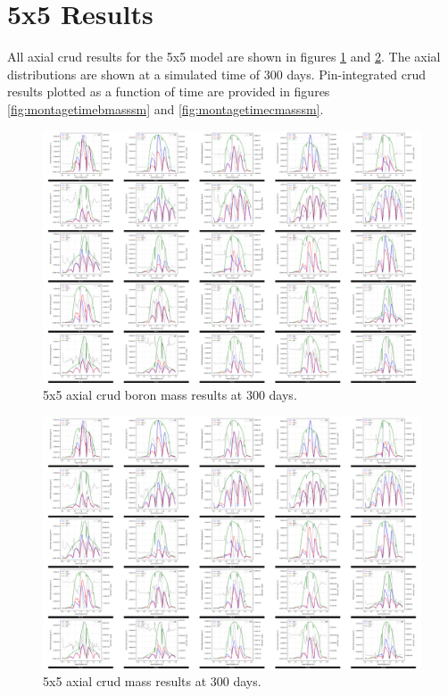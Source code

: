 
\section{5x5 Results}

All axial crud results for the 5x5 model are shown in figures \ref{fig:montageaxialbmasssm} and \ref{fig:montageaxialcmasssm}.  The axial distributions are shown at a simulated time of 300 days. Pin-integrated crud results plotted as a function of time are provided in figures \ref{fig:montagetimebmasssm} and \ref{fig:montagetimecmasssm}.

\begin{landscape}
\begin{figure}[H]
    \centering
    \includegraphics[width=.9\linewidth]{figs/5x5/imp/montage_axial_bmass_sm}
    \caption{5x5 axial crud boron mass results at 300 days.}
    \label{fig:montageaxialbmasssm}
\end{figure}
\begin{figure}[H]
    \centering
    \includegraphics[width=.9\linewidth]{figs/5x5/imp/montage_axial_cmass_sm}
    \caption{5x5 axial crud mass results at 300 days.}
    \label{fig:montageaxialcmasssm}
\end{figure}


\end{landscape}
